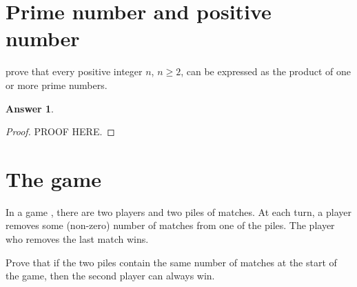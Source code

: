 \documentclass[a4paper]{article}
\renewcommand{\(}{\left(}
\renewcommand{\)}{\right)}
\theoremstyle{plain}
\theoremstyle{plain}
\theoremstyle{definition}
\newtheorem*{answer}{Answer}
\begin{document}
\section{Prime number and positive number}
prove that every positive integer $n$, $n \geq 2$, can be expressed as the product of one or more prime numbers.
\begin{shaded}
\begin{answer}
\begin{proof}
PROOF HERE.
\end{proof}
\end{answer}
\end{shaded}

\section{The game}
In a game , there are two players and two piles of matches. At each turn, a player removes some (non-zero) number of matches from one of the piles. The player who removes the last match wins.

Prove that if the two piles contain the same number of matches at the start of the game, then the second player can always win.
\end{document}
